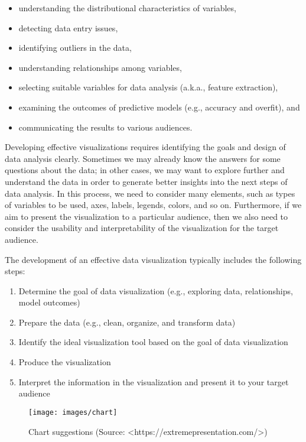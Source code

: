 \documentclass[]{book}
\providecommand{\tightlist}{%
  \setlength{\itemsep}{0pt}\setlength{\parskip}{0pt}}
\begin{document}
\begin{itemize}
\tightlist
\item
  understanding the distributional characteristics of variables,
\item
  detecting data entry issues,
\item
  identifying outliers in the data,
\item
  understanding relationships among variables,
\item
  selecting suitable variables for data analysis (a.k.a., feature extraction),
\item
  examining the outcomes of predictive models (e.g., accuracy and overfit), and
\item
  communicating the results to various audiences.
\end{itemize}

Developing effective visualizations requires identifying the goals and design of data analysis clearly. Sometimes we may already know the answers for some questions about the data; in other cases, we may want to explore further and understand the data in order to generate better insights into the next steps of data analysis. In this process, we need to consider many elements, such as types of variables to be used, axes, labels, legends, colors, and so on. Furthermore, if we aim to present the visualization to a particular audience, then we also need to consider the usability and interpretability of the visualization for the target audience.

The development of an effective data visualization typically includes the following steps:

\begin{enumerate}
\def\labelenumi{\arabic{enumi}.}
\tightlist
\item
  Determine the goal of data visualization (e.g., exploring data, relationships, model outcomes)
\item
  Prepare the data (e.g., clean, organize, and transform data)
\item
  Identify the ideal visualization tool based on the goal of data visualization
\item
  Produce the visualization
\item
  Interpret the information in the visualization and present it to your target audience
\end{enumerate}

\begin{figure}
\texttt{[image: images/chart]} \caption{Chart suggestions (Source: <https://extremepresentation.com/>)}\label{fig:fig1}
\end{figure}
\end{document}
